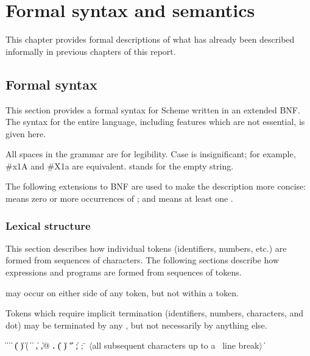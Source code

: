\chapter{Formal syntax and semantics}
\label{formalchapter}

This chapter provides formal descriptions of what has already been
described informally in previous chapters of this report.



\section{Formal syntax}
\label{BNF}

This section provides a formal syntax for Scheme written in an extended
BNF.  The syntax for the entire language, including features which are
not essential, is given here.

All spaces in the grammar are for legibility.  Case is insignificant;
for example, {\cf \#x1A} and {\cf \#X1a} are equivalent.  
stands for the empty string.

The following extensions to BNF are used to make the description more
concise:   means zero or more occurrences of
; and  means at least one
.


\subsection{Lexical structure}

This section describes how individual tokens (identifiers,
numbers, etc.) are formed from sequences of characters.  The following
sections describe how expressions and programs are formed from sequences
of tokens.

 may occur on either side of any token, but not
within a token.

\vest Tokens which require implicit termination (identifiers, numbers,
characters, and dot) may be terminated by any , but not
necessarily by anything else.

\begin{grammar}%
 \:  \|  \| 
\>  \|  \| 
\>  \| ( \| ) \| \sharpsign( \| \singlequote{} \| \backquote{} \| , \| ,@ \| {\bf.}
 \:  \| ( \| ) \| " \| ;
 \: 
 \: ; \= $\langle$\rm all subsequent characters up to a
		    \>\ \rm line break$\rangle$
 \:  \| 
 \: %
\end{grammar}

